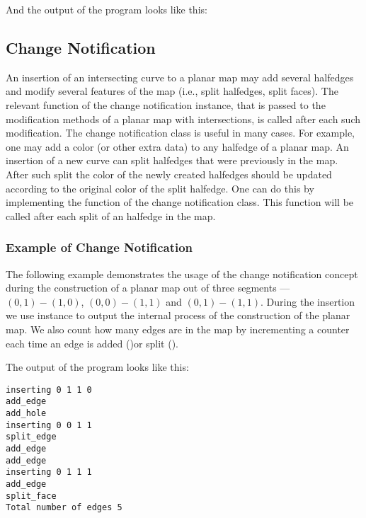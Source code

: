 And the output of the program looks like this:




\begin{ccAdvanced}
\subsection*{Change Notification}
An insertion of an intersecting curve to a planar map may add
several halfedges and modify several features of the map (i.e.,
split halfedges, split faces). The relevant function of the change
notification instance, that is passed to the modification methods
of a planar map with intersections, is called after each such
modification. The change notification class is useful in many
cases. For example, one may add a color (or other extra data) to
any halfedge of a planar map. An insertion of a new curve can
split halfedges that were previously in the map. After such split
the color of the newly created halfedges should be updated
according to the original color of the split halfedge. One can do
this by implementing the  function of the change
notification class. This function will be called after each split
of an halfedge in the map.


\subsubsection{Example of Change Notification}
\label{ssec:example2}
The following example demonstrates the usage of the change
notification concept during the construction of a
planar map out of three segments --- $(0,1)-(1,0)$, $(0,0)-(1,1)$
and $(0,1)-(1,1)$.
During the insertion we use  instance to
output the internal process of the construction of the planar map.
We also count how many edges are in the map by incrementing a
counter each time an edge is added ()or
split ().


The output of the program looks like this:
\begin{verbatim}
inserting 0 1 1 0
add_edge
add_hole
inserting 0 0 1 1
split_edge
add_edge
add_edge
inserting 0 1 1 1
add_edge
split_face
Total number of edges 5
\end{verbatim}

\end{ccAdvanced}




